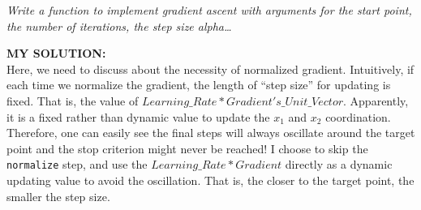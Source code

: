 \documentclass[
]{article}
\begin{document}
\emph{Write a function to implement gradient ascent with arguments for
the start point, the number of iterations, the step size alpha\ldots{}}

\textbf{MY SOLUTION:}\\
Here, we need to discuss about the necessity of normalized gradient.
Intuitively, if each time we normalize the gradient, the length of
``step size'' for updating is fixed. That is, the value of
\(Learning\_Rate*Gradient's\_Unit\_Vector\). Apparently, it is a fixed
rather than dynamic value to update the \(x_1\) and \(x_2\)
coordination. Therefore, one can easily see the final steps will always
oscillate around the target point and the stop criterion might never be
reached! I choose to skip the \texttt{normalize} step, and use the
\(Learning\_Rate*Gradient\) directly as a dynamic updating value to
avoid the oscillation. That is, the closer to the target point, the
smaller the step size.
\end{document}
